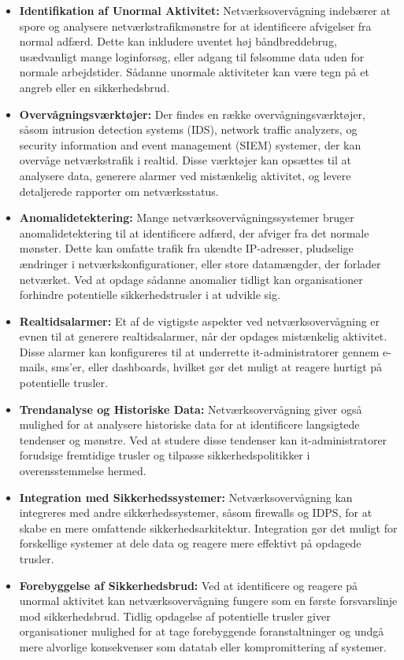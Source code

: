 \begin{itemize}
	\item \textbf{Identifikation af Unormal Aktivitet:} Netværksovervågning indebærer at spore og analysere netværkstrafikmønstre for at identificere afvigelser fra normal adfærd. Dette kan inkludere uventet høj båndbreddebrug, usædvanligt mange loginforsøg, eller adgang til følsomme data uden for normale arbejdstider. Sådanne unormale aktiviteter kan være tegn på et angreb eller en sikkerhedsbrud.
	
	\item \textbf{Overvågningsværktøjer:} Der findes en række overvågningsværktøjer, såsom intrusion detection systems (IDS), network traffic analyzers, og security information and event management (SIEM) systemer, der kan overvåge netværkstrafik i realtid. Disse værktøjer kan opsættes til at analysere data, generere alarmer ved mistænkelig aktivitet, og levere detaljerede rapporter om netværksstatus.
	
	\item \textbf{Anomalidetektering:} Mange netværksovervågningssystemer bruger anomalidetektering til at identificere adfærd, der afviger fra det normale mønster. Dette kan omfatte trafik fra ukendte IP-adresser, pludselige ændringer i netværkskonfigurationer, eller store datamængder, der forlader netværket. Ved at opdage sådanne anomalier tidligt kan organisationer forhindre potentielle sikkerhedstrusler i at udvikle sig.
	
	\item \textbf{Realtidsalarmer:} Et af de vigtigste aspekter ved netværksovervågning er evnen til at generere realtidsalarmer, når der opdages mistænkelig aktivitet. Disse alarmer kan konfigureres til at underrette it-administratorer gennem e-mails, sms'er, eller dashboards, hvilket gør det muligt at reagere hurtigt på potentielle trusler.
	
	\item \textbf{Trendanalyse og Historiske Data:} Netværksovervågning giver også mulighed for at analysere historiske data for at identificere langsigtede tendenser og mønstre. Ved at studere disse tendenser kan it-administratorer forudsige fremtidige trusler og tilpasse sikkerhedspolitikker i overensstemmelse hermed.
	
	\item \textbf{Integration med Sikkerhedssystemer:} Netværksovervågning kan integreres med andre sikkerhedssystemer, såsom firewalls og IDPS, for at skabe en mere omfattende sikkerhedsarkitektur. Integration gør det muligt for forskellige systemer at dele data og reagere mere effektivt på opdagede trusler.
	
	\item \textbf{Forebyggelse af Sikkerhedsbrud:} Ved at identificere og reagere på unormal aktivitet kan netværksovervågning fungere som en første forsvarslinje mod sikkerhedsbrud. Tidlig opdagelse af potentielle trusler giver organisationer mulighed for at tage forebyggende foranstaltninger og undgå mere alvorlige konsekvenser som datatab eller kompromittering af systemer.
\end{itemize}
